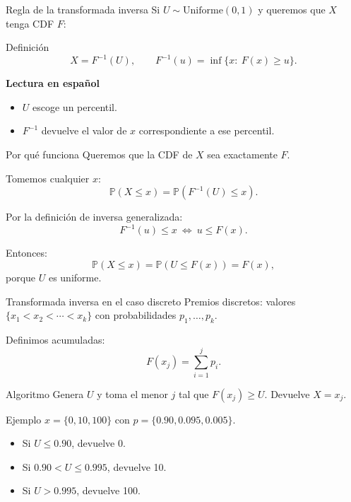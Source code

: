 \documentclass[aspectratio=1610, 9pt]{beamer}
\begin{document}
\begin{frame}{Regla de la transformada inversa}
    Si $U\sim \text{Uniforme}(0,1)$ y queremos que $X$ tenga CDF $F$:

    \vspace{0.35cm}
    \begin{block}{Definición}
    \[
    X = F^{-1}(U),
    \qquad
    F^{-1}(u)=\inf\{x:\ F(x)\ge u\}.
    \]
    \end{block}

    \vspace{0.25cm}
    \textbf{Lectura en español}
    \begin{itemize}
        \item $U$ escoge un percentil.
        \item $F^{-1}$ devuelve el valor de $x$ correspondiente a ese percentil.
    \end{itemize}
\end{frame}

\begin{frame}{Por qué funciona}
    Queremos que la CDF de $X$ sea exactamente $F$.

    \vspace{0.25cm}
    Tomemos cualquier $x$:
    \[
    \mathbb{P}(X\le x)
    =
    \mathbb{P}(F^{-1}(U)\le x).
    \]

    \vspace{0.15cm}
    Por la definición de inversa generalizada:
    \[
    F^{-1}(u)\le x \ \Longleftrightarrow\ u\le F(x).
    \]

    \vspace{0.15cm}
    Entonces:
    \[
    \mathbb{P}(X\le x)=\mathbb{P}(U\le F(x))=F(x),
    \]
    porque $U$ es uniforme.
\end{frame}

\begin{frame}{Transformada inversa en el caso discreto}
    Premios discretos: valores $\{x_1<x_2<\cdots<x_k\}$ con probabilidades $p_1,\dots,p_k$.

    \vspace{0.25cm}
    Definimos acumuladas:
    \[
    F(x_j)=\sum_{i=1}^j p_i.
    \]

    \vspace{0.25cm}
    \begin{block}{Algoritmo}
    Genera $U$ y toma el menor $j$ tal que $F(x_j)\ge U$.
    Devuelve $X=x_j$.
    \end{block}

    \vspace{0.25cm}
    \begin{exampleblock}{Ejemplo}
    $x=\{0,10,100\}$ con $p=\{0.90,0.095,0.005\}$.
    \begin{itemize}
        \item Si $U\le 0.90$, devuelve 0.
        \item Si $0.90<U\le 0.995$, devuelve 10.
        \item Si $U>0.995$, devuelve 100.
    \end{itemize}
    \end{exampleblock}
\end{frame}
\end{document}
